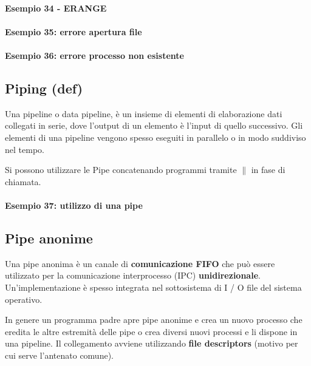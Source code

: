 \paragraph{Esempio 34 - ERANGE} \hfill \break{}

    
    \paragraph{Esempio 35: errore apertura file} \hfill \break{}

    
    \paragraph{Esempio 36: errore processo non esistente}
    
    \subsection{Piping (def)}
    Una pipeline o data pipeline, è un insieme di elementi di elaborazione dati collegati in serie, dove l'output di un elemento è l'input di quello successivo. Gli elementi di una pipeline vengono spesso eseguiti in parallelo o in modo suddiviso nel tempo. 
    
    Si possono utilizzare le Pipe concatenando programmi tramite $\|$ in fase di chiamata.

\paragraph{Esempio 37: utilizzo di una pipe} \hfill
    
    
 
    \subsection{Pipe anonime}
        Una pipe anonima è un canale di \textbf{comunicazione FIFO}  che può essere utilizzato per la comunicazione interprocesso (IPC) \textbf{unidirezionale}. Un'implementazione è spesso integrata nel sottosistema di I / O file del sistema operativo. 
        
        In genere un programma padre apre pipe anonime e crea un nuovo processo che eredita le altre estremità delle pipe o crea diversi nuovi processi e li dispone in una pipeline. Il collegamento avviene utilizzando \textbf{file  descriptors} (motivo per cui serve l'antenato comune).
        
